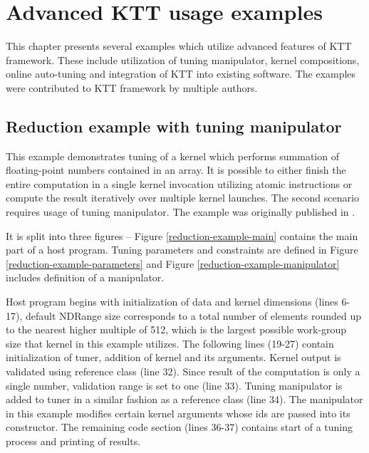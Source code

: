 \documentclass
[
    digital, %
    oneside, %
    table, %
    nolof, %
    nolot, %
    nocover %
]{fithesis3}
\begin{document}
\chapter{Advanced KTT usage examples}
\label{ktt-advanced-usage}
This chapter presents several examples which utilize advanced features of KTT framework. These include utilization of tuning manipulator, kernel
compositions, online auto-tuning and integration of KTT into existing software. The examples were contributed to KTT framework by multiple authors.

\section{Reduction example with tuning manipulator}
This example demonstrates tuning of a kernel which performs summation of floating-point numbers contained in an array. It is possible to either finish
the entire computation in a single kernel invocation utilizing atomic instructions or compute the result iteratively over multiple kernel launches. The
second scenario requires usage of tuning manipulator. The example was originally published in \cite{reduction-example}.

It is split into three figures -- Figure \ref{reduction-example-main} contains the main part of a host program. Tuning parameters and constraints are
defined in Figure \ref{reduction-example-parameters} and Figure \ref{reduction-example-manipulator} includes definition of a manipulator.

Host program begins with initialization of data and kernel dimensions (lines 6-17), default NDRange size corresponds to a total number of elements
rounded up to the nearest higher multiple of 512, which is the largest possible work-group size that kernel in this example utilizes. The following
lines (19-27) contain initialization of tuner, addition of kernel and its arguments. Kernel output is validated using reference class (line 32).
Since result of the computation is only a single number, validation range is set to one (line 33). Tuning manipulator is added to tuner in a similar
fashion as a reference class (line 34). The manipulator in this example modifies certain kernel arguments whose ids are passed into its constructor.
The remaining code section (lines 36-37) contains start of a tuning process and printing of results.
\end{document}
